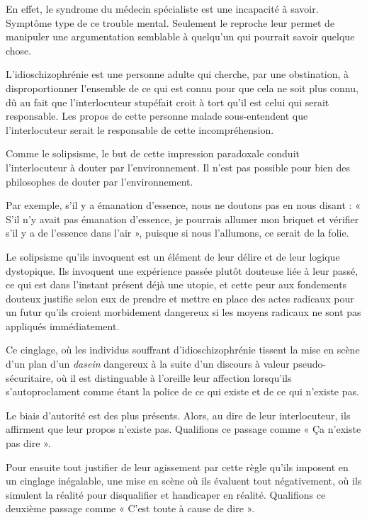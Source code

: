 \documentclass[12pt,oneside]{article}
\begin{document}
En effet, le syndrome du médecin spécialiste est une incapacité à savoir. Symptôme type de ce trouble mental. Seulement le reproche leur permet de manipuler une argumentation semblable à quelqu'un qui pourrait savoir quelque chose.

L'idioschizophrénie est une personne adulte qui cherche, par une obstination, à disproportionner l'ensemble de ce qui est connu pour que cela ne soit plus connu, dû au fait que l'interlocuteur stupéfait croit à tort qu'il est celui qui serait responsable. Les propos de cette personne malade sous-entendent que l'interlocuteur serait le responsable de cette incompréhension.

Comme le solipsisme, le but de cette impression paradoxale conduit l'interlocuteur à douter par l'environnement. Il n'est pas possible pour bien des philosophes de douter par l'environnement.

Par exemple, s'il y a émanation d'essence, nous ne doutons pas en nous disant : « S'il n'y avait pas émanation d'essence, je pourrais allumer mon briquet et vérifier s'il y a de l'essence dans l'air », puisque si nous l'allumons, ce serait de la folie.

Le solipsisme qu'ils invoquent est un élément de leur délire et de leur logique dystopique. Ils invoquent une expérience passée plutôt douteuse liée à leur passé, ce qui est dans l'instant présent déjà une utopie, et cette peur aux fondements douteux justifie selon eux de prendre et mettre en place des actes radicaux pour un futur qu'ils croient morbidement dangereux si les moyens radicaux ne sont pas appliqués immédiatement.

Ce cinglage, où les individus souffrant d'idioschizophrénie tissent la mise en scène d'un plan d'un \emph{dasein} dangereux à la suite d'un discours à valeur pseudo-sécuritaire, où il est distinguable à l'oreille leur affection lorsqu'ils s'autoproclament comme étant la police de ce qui existe et de ce qui n'existe pas.

Le biais d'autorité est des plus présents. Alors, au dire de leur interlocuteur, ils affirment que leur propos n'existe pas. Qualifions ce passage comme « Ça n'existe pas dire ».

Pour ensuite tout justifier de leur agissement par cette règle qu'ils imposent en un cinglage inégalable, une mise en scène où ils évaluent tout négativement, où ils simulent la réalité pour disqualifier et handicaper en réalité. Qualifions ce deuxième passage comme « C'est toute à cause de dire ».
\end{document}
